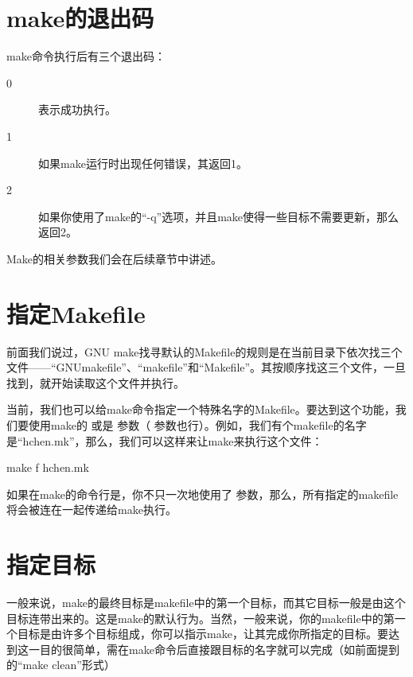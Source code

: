 \documentclass[a4paper,10pt]{sphinxmanual}
\begin{document}
\section{make的退出码}
\label{\detokenize{invoke:id1}}
make命令执行后有三个退出码：
\begin{description}
\item[{0}] \leavevmode
表示成功执行。

\item[{1}] \leavevmode
如果make运行时出现任何错误，其返回1。

\item[{2}] \leavevmode
如果你使用了make的“-q”选项，并且make使得一些目标不需要更新，那么返回2。

\end{description}

Make的相关参数我们会在后续章节中讲述。


\section{指定Makefile}
\label{\detokenize{invoke:makefile}}
前面我们说过，GNU make找寻默认的Makefile的规则是在当前目录下依次找三个文件——“GNUmakefile”、“makefile”和“Makefile”。其按顺序找这三个文件，一旦找到，就开始读取这个文件并执行。

当前，我们也可以给make命令指定一个特殊名字的Makefile。要达到这个功能，我们要使用make的
 或是  参数（  参数也行）。例如，我们有个makefile的名字是“hchen.mk”，那么，我们可以这样来让make来执行这个文件：

\begin{sphinxVerbatim}[commandchars=\\\{\}]
make \textendash{}f hchen.mk
\end{sphinxVerbatim}

如果在make的命令行是，你不只一次地使用了  参数，那么，所有指定的makefile将会被连在一起传递给make执行。


\section{指定目标}
\label{\detokenize{invoke:id2}}
一般来说，make的最终目标是makefile中的第一个目标，而其它目标一般是由这个目标连带出来的。这是make的默认行为。当然，一般来说，你的makefile中的第一个目标是由许多个目标组成，你可以指示make，让其完成你所指定的目标。要达到这一目的很简单，需在make命令后直接跟目标的名字就可以完成（如前面提到的“make clean”形式）
\end{document}
